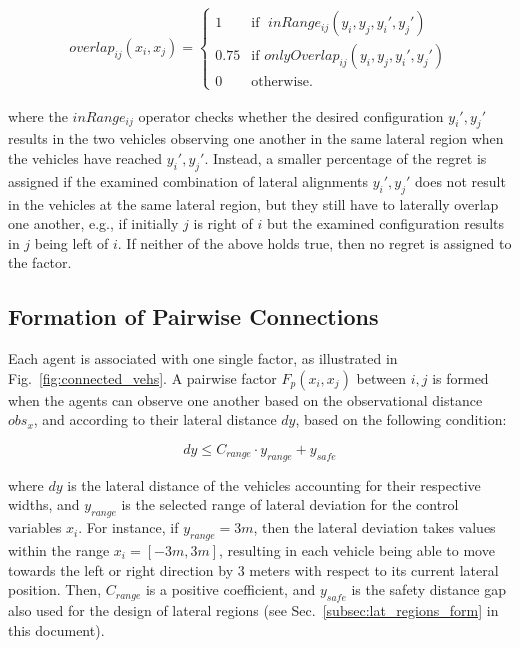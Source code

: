 %
\begin{align}
    overlap_{ij}(x_i,x_j) = 
    \begin{cases}
        1 & \text{if }  \; inRange_{ij}(y_i, y_j, y_i',y_j')\\
        0.75 & \text{if } onlyOverlap_{ij}(y_i, y_j, y_i',y_j')\\
        0    & \text{otherwise.}
    \end{cases}
\end{align}
%


\noindent where the $inRange_{ij}$ operator checks whether the desired configuration $y_i',y_j'$ results in the two vehicles observing one another in the same lateral region when the vehicles have reached  $y_i', y_j'$.
Instead, a smaller percentage of the regret is assigned if the examined combination of lateral alignments $y_i', y_j'$ does not result in the vehicles at the same lateral region, but they still have to laterally overlap one another, e.g., if initially $j$ is right of $i$ but the examined configuration results in $j$ being left of $i$.
If neither of the above holds true, then no regret is assigned to the factor.



\subsection{Formation of Pairwise Connections}\label{subsec:form_pairwise}

Each agent is associated with one single factor, as illustrated in Fig.~\ref{fig:connected_vehs}.
A pairwise factor $F_{p}(x_i,x_j)$ between $i,j$ is formed when the agents can observe one another based on the observational distance ${obs}_x$, and according to their lateral distance $dy$, based on the following condition:

\begin{equation}
    dy \leq C_{range}\cdot y_{range} + y_{safe}
\end{equation}

\noindent where $dy$ is the lateral distance of the vehicles accounting for their respective widths, and $y_{range}$ is the selected range of lateral deviation for the control variables $x_i$.
For instance, if $y_{range}=3m$, then the lateral deviation takes values within the range $x_i=[-3m,3m]$, resulting in each vehicle being able to move towards the left or right direction by $3$ meters with respect to its current lateral position.
Then, $C_{range}$ is a positive coefficient, and $y_{safe}$ is the safety distance gap also used for the design of lateral regions (see Sec.~\ref{subsec:lat_regions_form} in this document).



